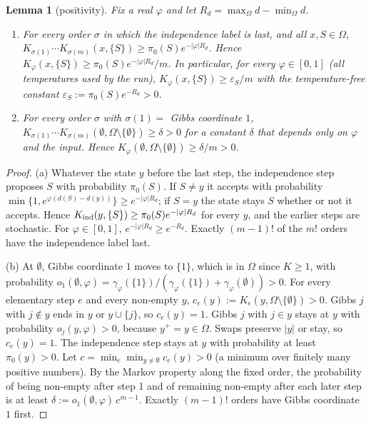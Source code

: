 \documentclass[11pt]{article}
\newtheorem{lemma}{Lemma}[section]
\theoremstyle{remark}
\newcommand{\Om}{\Omega}
\begin{document}
\begin{lemma}[positivity]\label{lem:pos}
Fix a real $\varphi$ and let $R_d=\max_\Om d-\min_\Om d$.
\begin{enumerate}[label=(\alph*)]
\item For every order $\sigma$ in which the independence label is last, and all $x,S\in\Om$, $K_{\sigma(1)}\cdots K_{\sigma(m)}(x,\{S\})\ge \pi_0(S)e^{-|\varphi|R_d}$. Hence $K_\varphi(x,\{S\})\ge \pi_0(S)e^{-|\varphi|R_d}/m$. In particular, for every $\varphi\in[0,1]$ (all temperatures used by the run), $K_\varphi(x,\{S\})\ge\varepsilon_S/m$ with the temperature-free constant $\varepsilon_S:=\pi_0(S)e^{-R_d}>0$.
\item For every order $\sigma$ with $\sigma(1)=$ Gibbs coordinate $1$, $K_{\sigma(1)}\cdots K_{\sigma(m)}(\emptyset,\Om\setminus\{\emptyset\})\ge \delta>0$ for a constant $\delta$ that depends only on $\varphi$ and the input. Hence $K_\varphi(\emptyset,\Om\setminus\{\emptyset\})\ge \delta/m>0$.
\end{enumerate}
\end{lemma}
\begin{proof}
(a) Whatever the state $y$ before the last step, the independence step proposes $S$ with probability $\pi_0(S)$. If $S\ne y$ it accepts with probability $\min\{1,e^{\varphi(d(S)-d(y))}\}\ge e^{-|\varphi|R_d}$; if $S=y$ the state stays $S$ whether or not it accepts. Hence $K_{\rm ind}(y,\{S\})\ge\pi_0(S)e^{-|\varphi|R_d}$ for every $y$, and the earlier steps are stochastic. For $\varphi\in[0,1]$, $e^{-|\varphi|R_d}\ge e^{-R_d}$. Exactly $(m-1)!$ of the $m!$ orders have the independence label last.

(b) At $\emptyset$, Gibbs coordinate $1$ moves to $\{1\}$, which is in $\Om$ since $K\ge1$, with probability $o_1(\emptyset,\varphi)=\gamma_\varphi(\{1\})/(\gamma_\varphi(\{1\})+\gamma_\varphi(\emptyset))>0$. For every elementary step $e$ and every non-empty $y$, $c_e(y):=K_e(y,\Om\setminus\{\emptyset\})>0$. Gibbs $j$ with $j\notin y$ ends in $y$ or $y\cup\{j\}$, so $c_e(y)=1$. Gibbs $j$ with $j\in y$ stays at $y$ with probability $o_j(y,\varphi)>0$, because $y^+=y\in\Om$. Swaps preserve $|y|$ or stay, so $c_e(y)=1$. The independence step stays at $y$ with probability at least $\pi_0(y)>0$. Let $c=\min_e\min_{y\ne\emptyset}c_e(y)>0$ (a minimum over finitely many positive numbers). By the Markov property along the fixed order, the probability of being non-empty after step 1 and of remaining non-empty after each later step is at least $\delta:=o_1(\emptyset,\varphi)\,c^{m-1}$. Exactly $(m-1)!$ orders have Gibbs coordinate $1$ first.
\end{proof}
\end{document}
